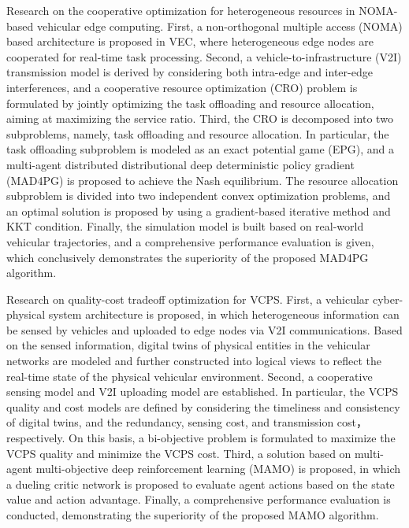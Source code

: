 \begin{eabstract}
 Research on the cooperative optimization for heterogeneous resources in NOMA-based vehicular edge computing.
First, a non-orthogonal multiple access (NOMA) based architecture is proposed in VEC, where heterogeneous edge nodes are cooperated for real-time task processing. 
Second, a vehicle-to-infrastructure (V2I) transmission model is derived by considering both intra-edge and inter-edge interferences, and a cooperative resource optimization (CRO) problem is formulated by jointly optimizing the task offloading and resource allocation, aiming at maximizing the service ratio.
Third, the CRO is decomposed into two subproblems, namely, task offloading and resource allocation.
In particular, the task offloading subproblem is modeled as an exact potential game (EPG), and a multi-agent distributed distributional deep deterministic policy gradient (MAD4PG) is proposed to achieve the Nash equilibrium. 
The resource allocation subproblem is divided into two independent convex optimization problems, and an optimal solution is proposed by using a gradient-based iterative method and KKT condition. 
Finally, the simulation model is built based on real-world vehicular trajectories, and a comprehensive performance evaluation is given, which conclusively demonstrates the superiority of the proposed MAD4PG algorithm.
 
 Research on quality-cost tradeoff optimization for VCPS.
First, a vehicular cyber-physical system architecture is proposed, in which heterogeneous information can be sensed by vehicles and uploaded to edge nodes via V2I communications. 
Based on the sensed information, digital twins of physical entities in the vehicular networks are modeled and further constructed into logical views to reflect the real-time state of the physical vehicular environment.
Second, a cooperative sensing model and V2I uploading model are established.
In particular, the VCPS quality and cost models are defined by considering the timeliness and consistency of digital twins, and the redundancy, sensing cost, and transmission cost，respectively. 
On this basis, a bi-objective problem is formulated to maximize the VCPS quality and minimize the VCPS cost.
Third, a solution based on multi-agent multi-objective deep reinforcement learning (MAMO) is proposed, in which a dueling critic network is proposed to evaluate agent actions based on the state value and action advantage.
Finally, a comprehensive performance evaluation is conducted, demonstrating the superiority of the proposed MAMO algorithm.


\end{eabstract}
